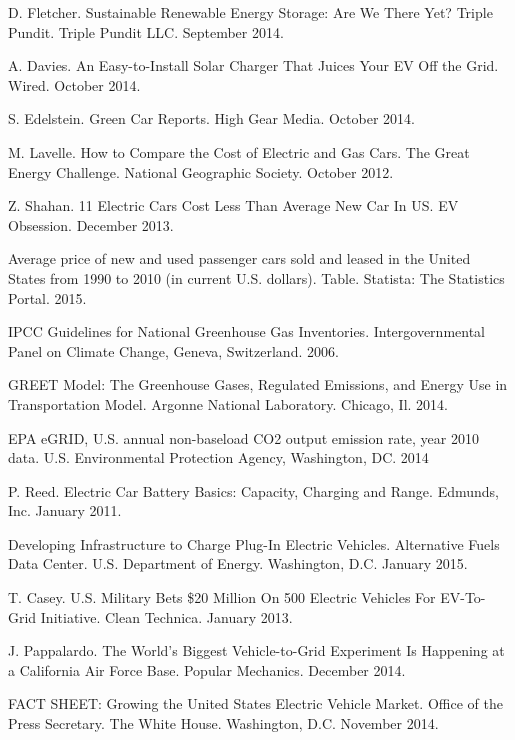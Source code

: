 \begin{thebibliography}{99}
 D. Fletcher. Sustainable Renewable Energy Storage: Are We There Yet? Triple Pundit. Triple Pundit LLC. September 2014.



 A. Davies. An Easy-to-Install Solar Charger That Juices Your EV Off the Grid. Wired. October 2014.

 S. Edelstein. Green Car Reports. High Gear Media. October 2014.

 M. Lavelle. How to Compare the Cost of Electric and Gas Cars. The Great Energy Challenge. National Geographic Society. October 2012.

 Z. Shahan. 11 Electric Cars Cost Less Than Average New Car In US. EV Obsession. December 2013.

 Average price of new and used passenger cars sold and leased in the United States from 1990 to 2010 (in current U.S. dollars). Table. Statista: The Statistics Portal. 2015.

 IPCC Guidelines for National Greenhouse Gas Inventories. Intergovernmental Panel on Climate Change, Geneva, Switzerland. 2006.


 GREET Model: The Greenhouse Gases, Regulated Emissions, and Energy Use in Transportation Model. Argonne National Laboratory. Chicago, Il. 2014.

 EPA  eGRID, U.S. annual non-baseload CO2 output emission rate, year 2010 data. U.S. Environmental Protection Agency, Washington, DC. 2014

 P. Reed. Electric Car Battery Basics: Capacity, Charging and Range. Edmunds, Inc. January 2011.

 Developing Infrastructure to Charge Plug-In Electric Vehicles. Alternative Fuels Data Center. U.S. Department of Energy. Washington, D.C. January 2015.

 T. Casey. U.S. Military Bets \$20 Million On 500 Electric Vehicles For EV-To-Grid Initiative. Clean Technica. January 2013.

 J. Pappalardo. The World's Biggest Vehicle-to-Grid Experiment Is Happening at a California Air Force Base. Popular Mechanics. December 2014.

 FACT SHEET: Growing the United States Electric Vehicle Market. Office of the Press Secretary. The White House. Washington, D.C. November 2014.





\end{thebibliography}


